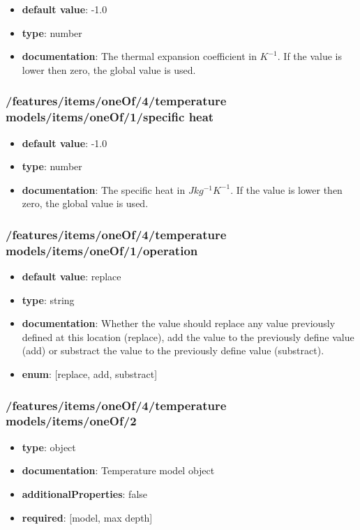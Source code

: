 \begin{itemize}\item {\bf default value}: -1.0
\item {\bf type}: number
\item {\bf documentation}: The thermal expansion coefficient in $K^{-1}$. If the value is lower then zero, the global value is used.
\end{itemize}\subsubsection{/features/items/oneOf/4/temperature models/items/oneOf/1/specific heat}
\begin{itemize}\item {\bf default value}: -1.0
\item {\bf type}: number
\item {\bf documentation}: The specific heat in $J kg^{-1} K^{-1}$. If the value is lower then zero, the global value is used.
\end{itemize}\subsubsection{/features/items/oneOf/4/temperature models/items/oneOf/1/operation}
\begin{itemize}\item {\bf default value}: replace
\item {\bf type}: string
\item {\bf documentation}: Whether the value should replace any value previously defined at this location (replace), add the value to the previously define value (add) or substract the value to the previously define value (substract).
\item {\bf enum}: [replace, add, substract]\end{itemize}\subsubsection{/features/items/oneOf/4/temperature models/items/oneOf/2}
\begin{itemize}\item {\bf type}: object
\item {\bf documentation}: Temperature model object
\item {\bf additionalProperties}: false
\item {\bf required}: [model, max depth]\end{itemize}
